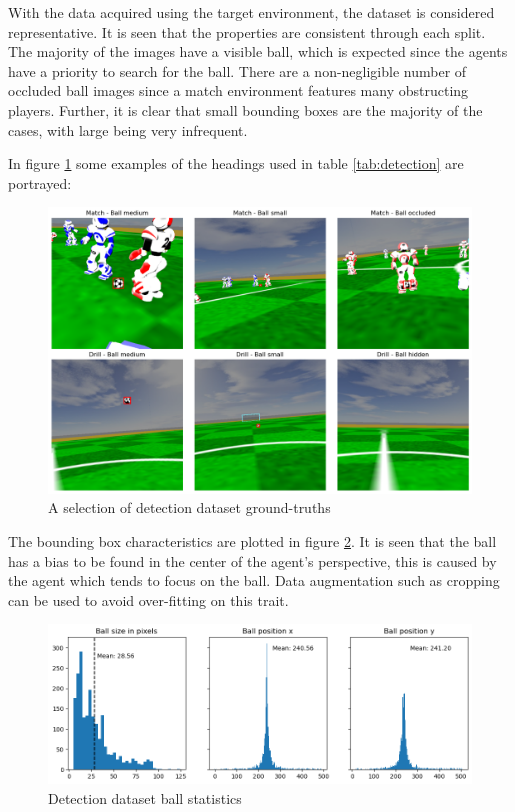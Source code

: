 \documentclass[a4paper,twoside,12pt]{report}
\begin{document}
With the data acquired using the target environment, the dataset is considered representative. It is seen that the properties are consistent through each split. The majority of the images have a visible ball, which is expected since the agents have a priority to search for the ball. There are a non-negligible number of occluded ball images since a match environment features many obstructing players. Further, it is clear that small bounding boxes are the majority of the cases, with large being very infrequent. 

In figure \ref{fig:detectimages} some examples of the headings used in table \ref{tab:detection} are portrayed:

\begin{figure}[h!]
\begin{center}
\includegraphics[width=16cm]{images/imagedetections.png}
\caption{A selection of detection dataset ground-truths}
\label{fig:detectimages}
\end{center}
\end{figure}

The bounding box characteristics are plotted in figure \ref{fig:detectplot}. It is seen that the ball has a bias to be found in the center of the agent's perspective, this is caused by the agent which tends to focus on the ball. Data augmentation such as cropping can be used to avoid over-fitting on this trait.

\begin{figure}[h!]
\begin{center}
\includegraphics[width=15cm]{images/plotdetections.png}
\caption{Detection dataset ball statistics}
\label{fig:detectplot}
\end{center}
\end{figure}
\end{document}
